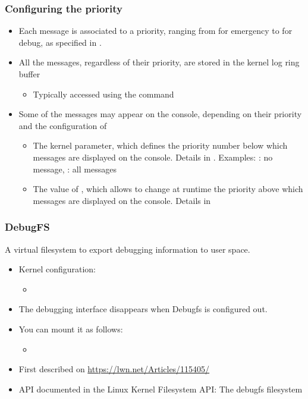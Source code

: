 \begin{frame}
  \frametitle{Configuring the priority}
  \begin{itemize}
  \item Each message is associated to a priority, ranging from  for
    emergency to  for debug, as specified in
    .
  \item All the messages, regardless of their priority, are stored in
    the kernel log ring buffer
    \begin{itemize}
    \item Typically accessed using the  command
    \end{itemize}
  \item Some of the messages may appear on the console, depending on
    their priority and the configuration of
    \begin{itemize}
    \item The  kernel parameter, which defines the
      priority number below which messages are displayed on the console.
      Details in .
      \newline Examples: : no message, : all messages
    \item The value of , which allows to
      change at runtime the priority above which messages are
      displayed on the console. Details in
    \end{itemize}
  \end{itemize}
\end{frame}

\begin{frame}
  \frametitle{DebugFS}
  A virtual filesystem to export debugging information to user space.
  \begin{itemize}
  \item Kernel configuration: 
    \begin{itemize}
    \item {}
    \end{itemize}
  \item The debugging interface disappears when Debugfs is
    configured out.
  \item You can mount it as follows:
    \begin{itemize}
    \item {}
    \end{itemize}
  \item First described on \url{https://lwn.net/Articles/115405/}
  \item API documented in the Linux Kernel Filesystem API:
    {The debugfs filesystem}
  \end{itemize}
\end{frame}

